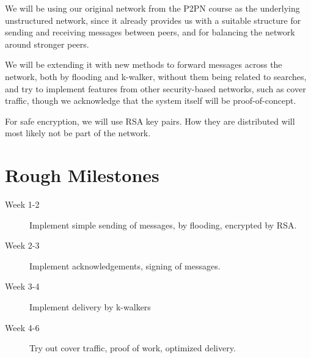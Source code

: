\documentclass{article}
\begin{document}
We will be using our original network from the P2PN course as the underlying unstructured network, since it already provides us with a suitable structure for sending and receiving messages between peers, and for balancing the network around stronger peers.

We will be extending it with new methods to forward messages across the network, both by flooding and k-walker, without them being related to searches, and try to implement features from other security-based networks, such as cover traffic, though we acknowledge that the system itself will be proof-of-concept.

For safe encryption, we will use RSA key pairs. How they are distributed will most likely not be part of the network.

\section{Rough Milestones}

\begin{description}
\item[Week 1-2] Implement simple sending of messages, by flooding, encrypted by RSA.
\item[Week 2-3] Implement acknowledgements, signing of messages.
\item[Week 3-4] Implement delivery by k-walkers
\item[Week 4-6] Try out cover traffic, proof of work, optimized delivery.
\end{description}
\end{document}
